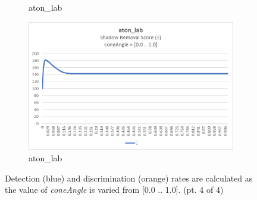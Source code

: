 \begin{appendices}
\begin{figure}
\begin{subfigure}{.45\linewidth}
  \caption{aton\_lab}
\end{subfigure}
\hfill
\begin{subfigure}{.45\linewidth}
  \includegraphics[width=1\linewidth]{figures/appendix/lab_coneAngle_score.jpg}
  \caption{aton\_lab}
\end{subfigure}
\caption{Detection (blue) and discrimination (orange) rates are calculated as the value of \textit{coneAngle} is varied from [0.0 .. 1.0]. (pt. 4 of 4)}

\end{figure}

\clearpage
\FloatBarrier
\begin{figure}


\end{figure}
\end{appendices}
